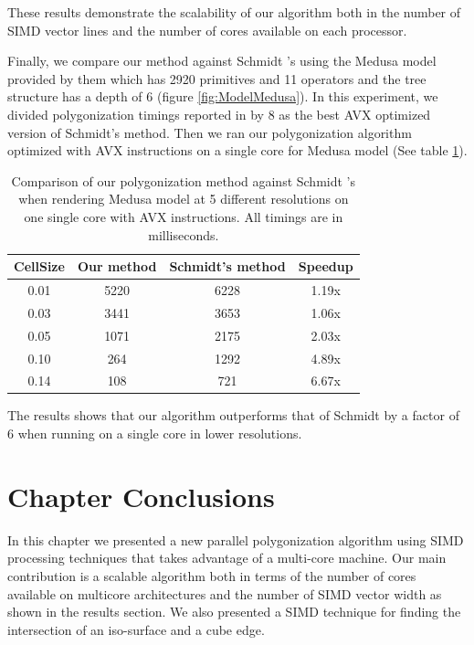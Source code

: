 These results demonstrate the scalability of our algorithm both in the number of SIMD vector lines and 
the number of cores available on each processor. 

Finally, we compare our method against Schmidt \etal's \cite{SWG2005} using the Medusa model provided by them   
which has 2920 primitives and 11 operators and the tree structure has a depth of 6 (figure \ref{fig:ModelMedusa}).
In this experiment, we divided polygonization timings reported in \cite{SWG2005} by 8 as the best AVX
optimized version of Schmidt's method. Then we ran our polygonization algorithm
optimized with AVX instructions on a single core for Medusa model (See table \ref{table:stats}). 

\begin{table}[H]
\begin{center}
	 \caption{\label{table:stats}
  {Comparison of our polygonization method against Schmidt \etal's \cite{SWG2005} 
  when rendering Medusa model at 5 different resolutions on one single core with AVX instructions. 
  All timings are in milliseconds.}
}
  \begin{tabular}{ | c | c | c | c |}
    \hline    
    CellSize & Our method & Schmidt's method & Speedup \\ \hline \hline
    0.01 & 5220 & 6228 & 1.19x\\ \hline
    0.03 & 3441 & 3653 & 1.06x \\ \hline
    0.05 & 1071 & 2175 & 2.03x	 \\ \hline
    0.10 & 264 & 1292 &	4.89x \\ \hline    
    0.14 & 108 & 721 & 6.67x \\        
    \hline
  	\end{tabular}
\end{center}
\end{table}


The results shows that our algorithm outperforms that of Schmidt \etal by a factor of 6 when running on a single core in lower resolutions. 



\section{Chapter Conclusions}\label{sec:futurework}
In this chapter we presented a new parallel polygonization algorithm using SIMD processing techniques that takes advantage of 
a multi-core machine. Our main contribution is a scalable algorithm both in terms of the number of cores available on 
multicore architectures and the number of SIMD vector width as shown in the results section.  We also presented a SIMD technique for 
finding the intersection of an iso-surface and a cube edge.

